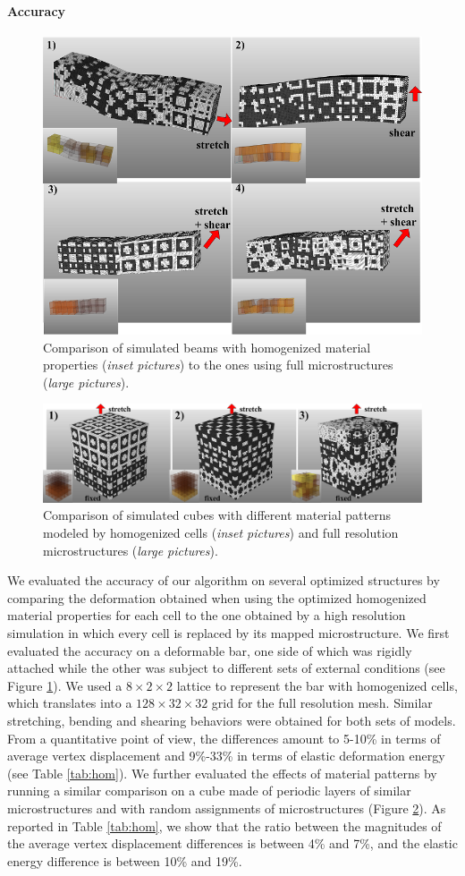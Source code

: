 \paragraph{Accuracy}
\begin{figure}
	\centering
	\includegraphics[width=.6\linewidth]{images/hom_beam.png}	
	\caption{Comparison of simulated beams with homogenized material properties (\emph{inset pictures}) to the ones using full microstructures (\emph{large pictures}).
		}\label{fig:hom_beam}
\end{figure}

\begin{figure}[h]
	\centering
	\includegraphics[width=.8\linewidth]{images/hom_cube_random.png}	
	\caption{Comparison of simulated cubes with different material patterns modeled by homogenized cells (\emph{inset pictures}) and full resolution microstructures (\emph{large pictures}).}
		\label{fig:hom_cube_2}
\end{figure}

We evaluated the accuracy of our algorithm on several optimized structures by comparing the deformation obtained when using the optimized homogenized material properties for each cell to the one obtained by a high resolution simulation in which every cell is replaced by its mapped microstructure.
We first evaluated the accuracy on a deformable bar, one side of which was rigidly attached while the other was subject to different sets of external conditions (see Figure \ref{fig:hom_beam}). We used a $8\times2\times2$ lattice to represent the bar with homogenized cells, which translates into a $128\times32\times32$ grid for the full resolution mesh. Similar stretching, bending and shearing behaviors were obtained for both sets of models. From a quantitative point of view, the differences amount to 5-10\% in terms of average vertex displacement and 9\%-33\% in terms of elastic deformation energy (see Table \ref{tab:hom}). We further evaluated the effects of material patterns by running a similar comparison on a cube made of periodic layers of similar microstructures and with random assignments of microstructures (Figure \ref{fig:hom_cube_2}).  As reported in Table \ref{tab:hom}, we show that the ratio between the magnitudes of the average vertex displacement differences is between 4\% and 7\%, and the elastic energy difference is between 10\% and 19\%.

